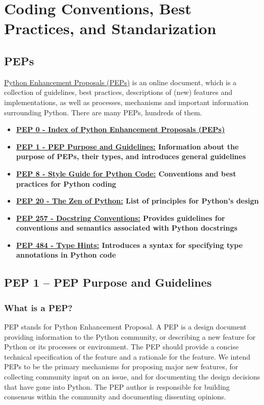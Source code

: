 \section{Coding Conventions, Best Practices, and Standarization}

\subsection{PEPs}

\href{https://peps.python.org/}{Python Enhancement Proposals (PEPs)} is an online document, which is a collection of guidelines, best practices, descriptions of (new) features and implementations, as well as processes, mechanisms and important information surrounding Python. There are many PEPs, hundreds of them.

\begin{itemize}
    \item \textbf{\href{https://www.python.org/dev/peps/}{PEP 0 - Index of Python Enhancement Proposals (PEPs)}}
    \item \textbf{\href{https://www.python.org/dev/peps/pep-0001/}{PEP 1 - PEP Purpose and Guidelines:} Information about the purpose of PEPs, their types, and introduces general guidelines}
    \item \textbf{\href{https://www.python.org/dev/peps/pep-0008/}{PEP 8 - Style Guide for Python Code:} Conventions and best practices for Python coding}
    \item \textbf{\href{https://www.python.org/dev/peps/pep-0020/}{PEP 20 - The Zen of Python:} List of principles for Python’s design}
    \item \textbf{\href{https://www.python.org/dev/peps/pep-0257/}{PEP 257 - Docstring Conventions:} Provides guidelines for conventions and semantics associated with Python docstrings}
    \item \textbf{\href{https://www.python.org/dev/peps/pep-0484/}{PEP 484 - Type Hints:} Introduces a syntax for specifying type annotations in Python code}
\end{itemize}

\newpage
\subsection{PEP 1 – PEP Purpose and Guidelines}
\subsubsection{What is a PEP?}
PEP stands for Python Enhancement Proposal. A PEP is a design document providing information to the Python community, or describing a new feature for Python or its processes or environment. The PEP should provide a concise technical specification of the feature and a rationale for the feature. We intend PEPs to be the primary mechanisms for proposing major new features, for collecting community input on an issue, and for documenting the design decisions that have gone into Python. The PEP author is responsible for building consensus within the community and documenting dissenting opinions.

